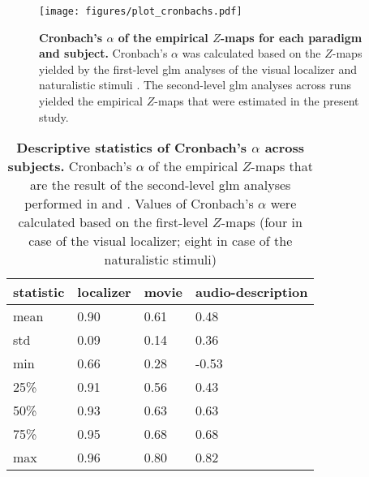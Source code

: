 


\begin{figure*}[tbp] \centering
    \texttt{[image: figures/plot\_cronbachs.pdf]}
    \caption{\textbf{Cronbach's $\alpha$ of the empirical $Z$-maps for each
    paradigm and subject.}
    Cronbach's $\alpha$ was calculated based on the $Z$-maps yielded by the
    first-level \ac{glm} analyses of the visual localizer
    \citep[four runs;][]{sengupta2016extension} and naturalistic stimuli
    \citep[eight runs;][]{haeusler2022processing}.
    The second-level \ac{glm} analyses across runs yielded the empirical
    $Z$-maps that were estimated in the present study.
    }
\label{fig:cronbachs}
\end{figure*}


\begin{table*}[btp]
\centering
    \caption{
    \textbf{Descriptive statistics of Cronbach's $\alpha$ across subjects.}
    Cronbach's $\alpha$ of the empirical $Z$-maps that are the result of the
    second-level \ac{glm} analyses performed in
    \citet{sengupta2016extension} and \citet{haeusler2022processing}. Values of
    Cronbach's $\alpha$ were calculated based on the first-level $Z$-maps (four
    in case of the visual localizer; eight in case of the naturalistic stimuli)}
\label{tab:cronbachs}
\begin{tabular}{llll}
    \toprule
    \textbf{statistic} & \textbf{localizer} & \textbf{movie} & \textbf{audio-description} \\
    \midrule
    mean & 0.90 & 0.61 & 0.48 \tabularnewline
    std & 0.09 & 0.14 & 0.36 \tabularnewline
    min & 0.66 & 0.28 & -0.53 \tabularnewline
    25\% & 0.91 & 0.56 & 0.43 \tabularnewline
    50\% & 0.93 & 0.63 & 0.63 \tabularnewline
    75\% & 0.95 & 0.68 & 0.68 \tabularnewline
    max & 0.96 & 0.80 & 0.82 \tabularnewline
    \bottomrule
\end{tabular}
\end{table*}



